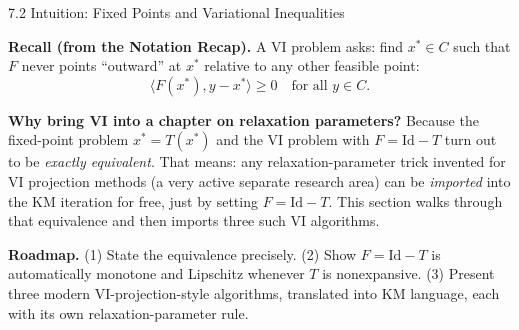 \documentclass[aspectratio=169,10pt]{beamer}
\newcommand{\inner}[2]{\langle #1, #2 \rangle}
\newcommand{\Id}{\mathrm{Id}}
\begin{document}
\begin{frame}{7.2 Intuition: Fixed Points and Variational Inequalities}

  \textbf{Recall (from the Notation Recap).} A VI problem asks:
  find $x^*\in C$ such that $F$ never points ``outward'' at $x^*$
  relative to any other feasible point:
  \[
    \inner{F(x^*)}{y-x^*}\ge0 \quad \text{for all } y\in C. \tag{7.16}
  \]

  \textbf{Why bring VI into a chapter on relaxation parameters?}
  Because the fixed-point problem $x^*=T(x^*)$ and the VI problem
  with $F=\Id-T$ turn out to be \emph{exactly equivalent}. That
  means: any relaxation-parameter trick invented for VI projection
  methods (a very active separate research area) can be
  \emph{imported} into the KM iteration for free, just by setting
  $F=\Id-T$. This section walks through that equivalence and then
  imports three such VI algorithms.

  \vspace{0.3em}
  \textbf{Roadmap.} (1) State the equivalence precisely. (2) Show
  $F=\Id-T$ is automatically monotone and Lipschitz whenever $T$ is
  nonexpansive. (3) Present three modern VI-projection-style
  algorithms, translated into KM language, each with its own
  relaxation-parameter rule.

\end{frame}
\end{document}
